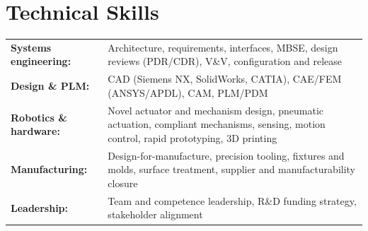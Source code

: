 \documentclass[10pt,a4paper]{article}
\begin{document}
\section{Technical Skills}
{\small
\begin{tabularx}{\textwidth}{@{}lX@{}}
  \textbf{Systems engineering:} & Architecture, requirements, interfaces, MBSE, design reviews (PDR/CDR), V\&V, configuration and release \\
  \textbf{Design \& PLM:} & CAD (Siemens NX, SolidWorks, CATIA), CAE/FEM (ANSYS/APDL), CAM, PLM/PDM \\
  \textbf{Robotics \& hardware:} & Novel actuator and mechanism design, pneumatic actuation, compliant mechanisms, sensing, motion control, rapid prototyping, 3D printing \\
  \textbf{Manufacturing:} & Design-for-manufacture, precision tooling, fixtures and molds, surface treatment, supplier and manufacturability closure \\
  \textbf{Leadership:} & Team and competence leadership, R\&D funding strategy, stakeholder alignment \\
\end{tabularx}
}
\end{document}
